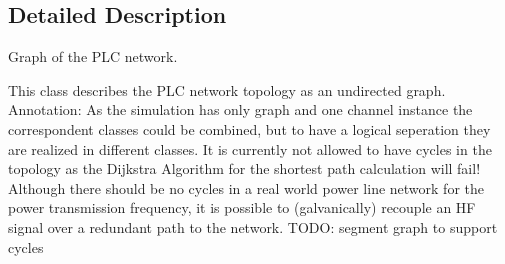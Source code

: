 \subsection{\-Detailed \-Description}
\-Graph of the \-P\-L\-C network. 

\-This class describes the \-P\-L\-C network topology as an undirected graph. \-Annotation\-: \-As the simulation has only graph and one channel instance the correspondent classes could be combined, but to have a logical seperation they are realized in different classes. \-It is currently not allowed to have cycles in the topology as the \-Dijkstra \-Algorithm for the shortest path calculation will fail! \-Although there should be no cycles in a real world power line network for the power transmission frequency, it is possible to (galvanically) recouple an \-H\-F signal over a redundant path to the network. \-T\-O\-D\-O\-: segment graph to support cycles 

